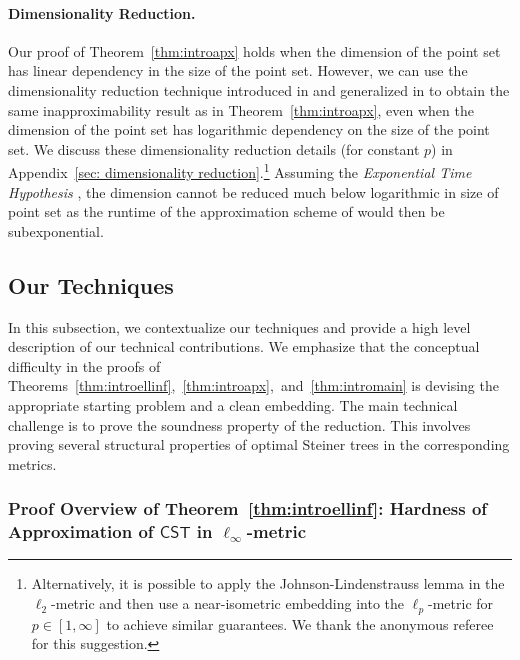 \documentclass{theoretics}
\newcommand{\1}{\textbf{1}}
\newcommand{\cst}{$\mathsf{CST}$\xspace}
\begin{document}
 \paragraph{Dimensionality Reduction.}
Our proof of Theorem~\ref{thm:introapx} holds when the dimension of the point set has linear dependency in the size of the point set. However, we can use the dimensionality reduction technique introduced in \cite{CK19} and generalized in \cite{CKL22} to obtain the same inapproximability result as in Theorem~\ref{thm:introapx}, even when the dimension of the point set has logarithmic dependency on the size of the point set. We discuss these dimensionality reduction details (for constant $p$) in Appendix~\ref{sec: dimensionality reduction}.\footnote{Alternatively, it is possible to apply the Johnson-Lindenstrauss lemma \cite{Johnson_Lindenstrauss_1984} in the $\ell_2$-metric and then use a near-isometric embedding into the $\ell_p$-metric for $p \in [1,\infty]$ to achieve similar guarantees. We thank the anonymous referee for this suggestion.}
Assuming the \emph{Exponential Time Hypothesis} \cite{IP01,IPZ01}, the dimension cannot be reduced much below logarithmic in size of point set as the runtime of the approximation scheme of \cite{Arora_1998,Mitchell99,RaoS98} would then be subexponential. 






 
  
 \subsection{Our Techniques}\label{sec:techniques}


In this subsection, we contextualize our techniques and provide a high level description of our technical contributions. We emphasize that the conceptual difficulty in the proofs of Theorems~\ref{thm:introellinf},~\ref{thm:introapx},~and~\ref{thm:intromain} is devising the appropriate starting problem and a clean embedding. The main technical challenge is to prove the soundness property of the reduction. This involves proving several structural properties of optimal Steiner trees in the corresponding metrics.



\subsubsection{\texorpdfstring{Proof Overview of Theorem~\ref{thm:introellinf}: Hardness of Approximation of \cst in $\ell_{\infty}$-metric}{Proof Overview of Theorem~\ref{thm:introellinf}: Hardness of Approximation of CST in linf-metric}}
\end{document}
